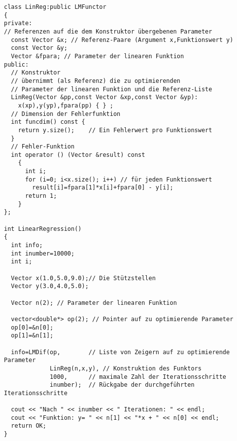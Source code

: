 \begin{verbatim}
class LinReg:public LMFunctor
{
private:
// Referenzen auf die dem Konstruktor übergebenen Parameter
  const Vector &x; // Referenz-Paare (Argument x,Funktionswert y)
  const Vector &y;
  Vector &fpara; // Parameter der linearen Funktion
public:
  // Konstruktor
  // übernimmt (als Referenz) die zu optimierenden
  // Parameter der linearen Funktion und die Referenz-Liste
  LinReg(Vector &pp,const Vector &xp,const Vector &yp):
    x(xp),y(yp),fpara(pp) { } ;
  // Dimension der Fehlerfunktion
  int funcdim() const {
    return y.size();    // Ein Fehlerwert pro Funktionswert
  }
  // Fehler-Funktion
  int operator () (Vector &result) const
    {
      int i;
      for (i=0; i<x.size(); i++) // für jeden Funktionswert
        result[i]=fpara[1]*x[i]+fpara[0] - y[i];
      return 1;
    }
};

int LinearRegression()
{
  int info;
  int inumber=10000;
  int i;

  Vector x(1.0,5.0,9.0);// Die Stützstellen
  Vector y(3.0,4.0,5.0);

  Vector n(2); // Parameter der linearen Funktion

  vector<double*> op(2); // Pointer auf zu optimierende Parameter
  op[0]=&n[0];
  op[1]=&n[1];

  info=LMDif(op,        // Liste von Zeigern auf zu optimierende Parameter
             LinReg(n,x,y), // Konstruktion des Funktors
             1000,      // maximale Zahl der Iterationsschritte
             inumber);  // Rückgabe der durchgeführten Iterationsschritte

  cout << "Nach " << inumber << " Iterationen: " << endl;
  cout << "Funktion: y= " << n[1] << "*x + " << n[0] << endl;
  return OK;
}

\end{verbatim}

